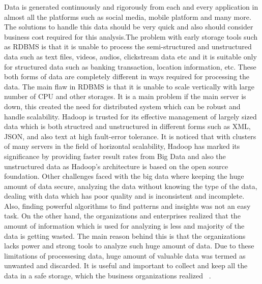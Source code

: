 Data is generated continuously and rigorously from each and every application in
almost all the platforms such as social media, mobile platform and many more. 
The solutions to handle this data should be very quick and also should consider
business cost required for this analysis.The problem with early storage tools 
such as RDBMS is that it is unable to process the semi-structured and 
unstructured data such as   text files, videos, audios, clickstream data etc and
it is suitable only for structured data such as banking transaction, location 
information, etc. These both forms of data are completely different in ways 
required for processing the data. The main flaw in RDBMS is that it is unable to
scale vertically with large number of CPU and other storages. It is a main 
problem if the main server is down, this created the need for distributed system
which can be robust and handle scalability. Hadoop is trusted for its effective 
management of largely sized data which is both structred and unstructured in 
different forms such as XML, JSON, and also text at high fault-error tolerance. 
It is noticed that with clusters of many servers in the field of horizontal 
scalability, Hadoop has marked its significance by providing faster result rates
from Big Data and also the unstructured data as Hadoop's architecture is based 
on the open source foundation. Other challenges faced with the big data where 
keeping the huge amount of data secure, analyzing the data without knowing the 
type of the data, dealing with data which has poor quality and is inconsistent 
and incomplete. Also, finding powerful algorithms to find patterns and insights
was not an easy task. On the other hand, the organizations and enterprises 
realized that the amount of information which is used for analyzing is less and 
majority of the data is getting wasted. The main reason behind this is that the 
organizations lacks power and strong tools to analyze such huge amount of data. 
Due to these limitations of processesing data, huge amount of valuable data was 
termed as unwanted and discarded. It is useful and important to collect and 
keep all the data in a safe storage, which the business organizations realized
~\cite{hid-sp18-406-hadoop-intro1}.

